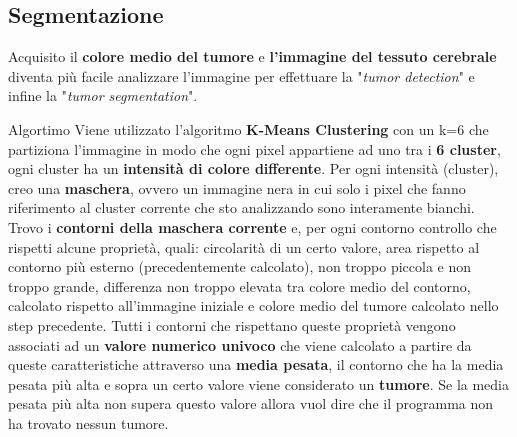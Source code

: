 \documentclass{article}
\begin{document}
\clearpage

\subsection{Segmentazione}
Acquisito il \textbf{colore medio del tumore} e \textbf{l'immagine del tessuto cerebrale} diventa più facile analizzare 
l'immagine per effettuare la "\textit{tumor detection}" e infine la "\textit{tumor segmentation}".

\begin{my theorem}{Algortimo}
    Viene utilizzato l'algoritmo \textbf{K-Means Clustering} con un k=6 che partiziona l'immagine in modo che 
    ogni pixel appartiene ad uno tra i \textbf{6 cluster}, ogni cluster ha un \textbf{intensità di colore differente}.
    Per ogni intensità (cluster), creo una \textbf{maschera}, ovvero un immagine nera in cui solo i pixel che fanno riferimento al 
    cluster corrente che sto analizzando sono interamente bianchi.
    Trovo i \textbf{contorni della maschera corrente} e, per ogni contorno controllo che rispetti alcune proprietà, quali: circolarità di un 
    certo valore, area rispetto al contorno più esterno (precedentemente calcolato), non troppo piccola e non troppo grande, 
    differenza non troppo elevata tra colore medio del contorno, calcolato rispetto all'immagine iniziale e colore medio del
    tumore calcolato nello step precedente.
    Tutti i contorni che rispettano queste proprietà vengono associati ad un \textbf{valore numerico univoco} che viene calcolato a 
    partire da queste caratteristiche attraverso una \textbf{media pesata}, il contorno che ha la media pesata più alta e 
    sopra un certo valore viene considerato un \textbf{tumore}.
    Se la media pesata più alta non supera questo valore allora vuol dire che il programma non ha trovato nessun tumore.
\end{my theorem}
\end{document}
